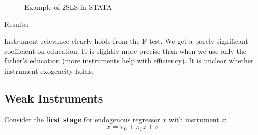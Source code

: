 \documentclass[11pt]{article}
\begin{document}
\begin{figure}[h]
    \centering
    \qquad
    \caption{Example of 2SLS in STATA}%
    \label{fig:2sls example}%
\end{figure}

\begin{example}
Results:

Instrument relevance clearly holds from the F-test. We get a barely significant coefficient on education. It is slightly more precise than when we use only the father's education (more instruments help with efficiency). It is unclear whether instrument exogeneity holds.  
\end{example}

\subsection{Weak Instruments}

Consider the \textbf{first stage} for endogenous regressor $x$ with instrument $z$:
\[x= \pi_0 + \pi_1 z + v\]
\end{document}
